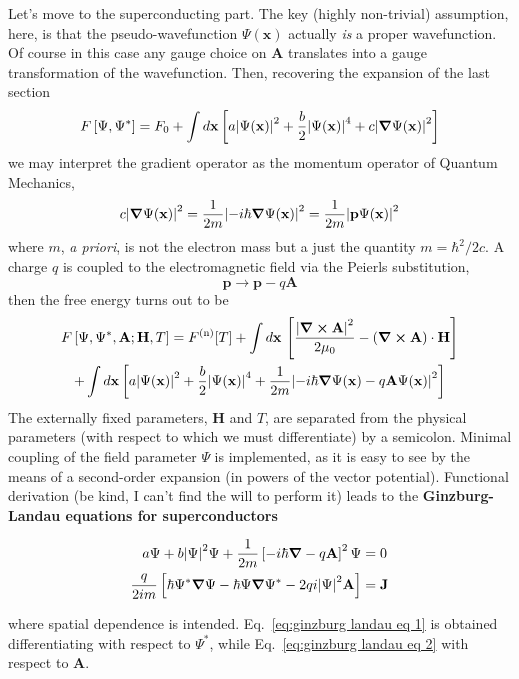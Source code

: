 Let's move to the superconducting part. The key (highly non-trivial) assumption, here, is that the pseudo-wavefunction $\Psi(\mathbf{x})$ actually \textit{is} a proper wavefunction. Of course in this case any gauge choice on $\mathbf{A}$ translates into a gauge transformation of the wavefunction. Then, recovering the expansion of the last section
\[ 
    F\left[{\Psi,\Psi^*}\right] = F_0 + \int d\mathbf{x} \left[{
        a \abs{\Psi(\mathbf{x)} }^2 + \frac{b}{2} \abs{ \Psi(\mathbf{x)} }^4 + c \abs{\grad \Psi(\mathbf{x)} }^2
    }\right]
\]
we may interpret the gradient operator as the momentum operator of Quantum Mechanics,
\[
    c \abs{\grad \Psi(\mathbf{x)} }^2 = \frac{1}{2m} \abs{-i\hbar\grad \Psi(\mathbf{x)} }^2 = \frac{1}{2m} \abs{\mathbf{p} \Psi(\mathbf{x)} }^2
\]
where $m$, \textit{a priori}, is not the electron mass but a just the quantity $m=\hbar^2/2c$. A charge $q$ is coupled to the electromagnetic field via the Peierls substitution,
\[
    \mathbf{p} \to \mathbf{p} - q \mathbf{A}
\]
then the free energy turns out to be
\begin{multline*}
    F \left[{ \Psi,\Psi^*,\mathbf{A}; \mathbf{H},T }\right] = F^{(\mathrm{n})}[T] + \int d\mathbf{x} \, \left[{ \frac{\abs{\curl\mathbf{A}}^2}{2\mu_0} - \left({ \curl\mathbf{A} }\right) \cdot \mathbf{H} }\right] \\
    + \int d\mathbf{x} \left[{
        a \abs{\Psi(\mathbf{x)} }^2 + \frac{b}{2} \abs{ \Psi(\mathbf{x)} }^4 + \frac{1}{2m} \abs{-i\hbar\grad \Psi(\mathbf{x)} - q \mathbf{A} \Psi(\mathbf{x)} }^2
    }\right]
\end{multline*}
The externally fixed parameters, $\mathbf{H}$ and $T$, are separated from the physical parameters (with respect to which we must differentiate) by a semicolon. Minimal coupling of the field parameter $\Psi$ is implemented, as it is easy to see by the means of a second-order expansion (in powers of the vector potential). Functional derivation (be kind, I can't find the will to perform it) leads to the \textbf{Ginzburg-Landau equations for superconductors}
\begin{eqbox}
    \begin{align}
        a \Psi + b  \abs{\Psi}^2 \Psi + \frac{1}{2m} \left[{-i\hbar\grad - q \mathbf{A} }\right]^2 \Psi &= 0 \label{eq:ginzburg landau eq 1}\\
        \frac{q}{2im} \left[{ \hbar \Psi^* \grad \Psi - \hbar \Psi \grad \Psi^* - 2qi \abs{\Psi}^2 \mathbf{A}  }\right] &= \mathbf{J} \label{eq:ginzburg landau eq 2}
    \end{align}\vspace{-0.5em}
\end{eqbox}
where spatial dependence is intended. Eq.~\eqref{eq:ginzburg landau eq 1} is obtained differentiating with respect to $\Psi^*$, while Eq.~\eqref{eq:ginzburg landau eq 2} with respect to $\mathbf{A}$.

